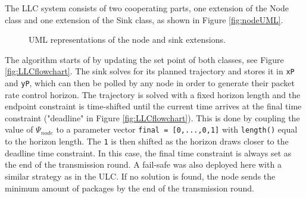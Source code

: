 \noindent The LLC system consists of two cooperating parts, one extension of the Node class and one extension of the Sink class, as shown in Figure \ref{fig:nodeUML}. 

\begin{figure}[h]
  \centering
  \hfill
  \caption{UML representations of the node and sink extensions.}
  \label{fig:LLCUML}
\end{figure}

\noindent The algorithm starts of by updating the set point of both classes, see Figure \ref{fig:LLCflowchart}. The sink solves for its planned trajectory and stores it in \verb!xP! and \verb!yP!, which can then be polled by any node in order to generate their packet rate control horizon. The trajectory is solved with a fixed horizon length and the endpoint constraint is time-shifted until the current time arrives at the final time constraint ("deadline" in Figure \ref{fig:LLCflowchart}). This is done by coupling the value of $\Psi_{node}$ to a parameter vector \verb!final = [0,...,0,1]! with \verb!length()! equal to the horizon length. The \verb!1! is then shifted as the horizon draws closer to the deadline time constraint. In this case, the final time constraint is always set as the end of the transmission round. A fail-safe was also deployed here with a similar strategy as in the ULC. If no solution is found, the node sends the minimum amount of packages by the end of the transmission round.

